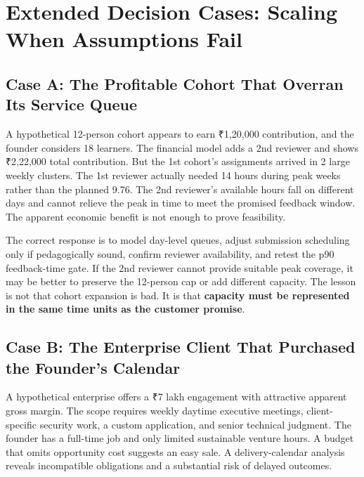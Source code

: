 \section*{Extended Decision Cases: Scaling When Assumptions Fail}
\label{sec:extended_decision_cases}

\subsection*{Case A: The Profitable Cohort That Overran Its Service Queue}

A hypothetical 12-person cohort appears to earn ₹1,20,000 contribution, and the founder considers 18 learners. The financial model adds a 2nd reviewer and shows ₹2,22,000 total contribution. But the 1st cohort's assignments arrived in 2 large weekly clusters. The 1st reviewer actually needed 14 hours during peak weeks rather than the planned 9.76. The 2nd reviewer's available hours fall on different days and cannot relieve the peak in time to meet the promised feedback window. The apparent economic benefit is not enough to prove feasibility.

The correct response is to model day-level queues, adjust submission scheduling only if pedagogically sound, confirm reviewer availability, and retest the p90 feedback-time gate. If the 2nd reviewer cannot provide suitable peak coverage, it may be better to preserve the 12-person cap or add different capacity. The lesson is not that cohort expansion is bad. It is that \textbf{capacity must be represented in the same time units as the customer promise}.

\subsection*{Case B: The Enterprise Client That Purchased the Founder's Calendar}

A hypothetical enterprise offers a ₹7 lakh engagement with attractive apparent gross margin. The scope requires weekly daytime executive meetings, client-specific security work, a custom application, and senior technical judgment. The founder has a full-time job and only limited sustainable venture hours. A budget that omits opportunity cost suggests an easy sale. A delivery-calendar analysis reveals incompatible obligations and a substantial risk of delayed outcomes.

